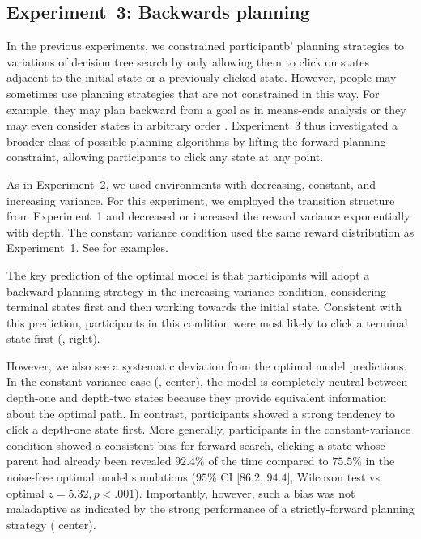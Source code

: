 \subsection{Experiment~3: Backwards planning}\label{sec:planning-results3}
In the previous experiments, we constrained participantb' planning strategies to variations of decision tree search by only allowing them to click on states adjacent to the initial state or a previously-clicked state. However, people may sometimes use planning strategies that are not constrained in this way. For example, they may plan backward from a goal as in means-ends analysis \citep{newell1972human} or they may even consider states in arbitrary order \citep{sutton1990integrated}. Experiment~3 thus investigated a broader class of possible planning algorithms by lifting the forward-planning constraint, allowing participants to click any state at any point.

As in Experiment~2, we used environments with decreasing, constant, and increasing variance. For this experiment, we employed the transition structure from Experiment~1 and decreased or increased the reward variance exponentially with depth. The constant variance condition used the same reward distribution as Experiment~1. See  for examples.

The key prediction of the optimal model is that participants will adopt a backward-planning strategy in the increasing variance condition, considering terminal states first and then working towards the initial state. Consistent with this prediction, participants in this condition were most likely to click a terminal state first (, right).

However, we also see a systematic deviation from the optimal model predictions. In the constant variance case (, center), the model is completely neutral between depth-one and depth-two states because they provide equivalent information about the optimal path. In contrast, participants showed a strong tendency to click a depth-one state first. More generally, participants in the constant-variance condition showed a consistent bias for forward search, clicking a state whose parent had already been revealed $92.4\%$ of the time compared to $75.5\%$ in the noise-free optimal model simulations ($95\%$ CI [$86.2$, $94.4$], Wilcoxon test vs. optimal $z = 5.32, p < .001$). Importantly, however, such a bias was not maladaptive as indicated by the strong performance of a strictly-forward planning strategy ( center).

